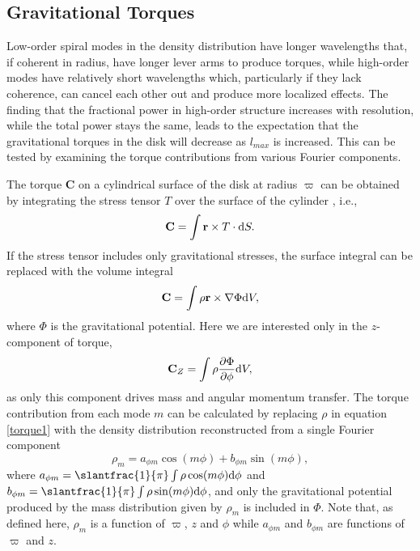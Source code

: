 \documentclass[manuscript]{aastex}
\begin{document}
\subsection{Gravitational Torques}

Low-order spiral modes in the density distribution have longer wavelengths that, if coherent in radius, have longer lever 
arms to produce torques, while high-order modes have relatively short wavelengths which, particularly if they 
lack coherence, can cancel each other out and produce more localized effects. 
The finding that the fractional power in high-order structure increases
with resolution, while the total power stays the same, leads to
 the expectation that the gravitational torques in the disk will decrease as $l_{max}$ is increased. This can be tested by examining the torque contributions from  various Fourier components.

The torque {\bf C} on a cylindrical surface of the disk at radius $\varpi$ can be obtained by integrating the stress tensor $T$ over the surface of the cylinder \citep{lyndenbell1972, boley2006}, i.e., 
\begin{equation}
{\rm {\bf C}} = \int {\bf r} \times T \cdot {\rm d}S.
\end{equation}
If the stress tensor includes only gravitational stresses, the surface integral can be replaced with the volume integral
\begin{equation}
{\rm \bf C} = \int \rho {\bf r} \times \nabla \Phi {\rm d}V,
\end{equation}
where $\Phi$ is the gravitational potential.  Here we are interested only in the $z$-component of torque,  
\begin{equation}
\label{torque1}
{\rm \bf C}_Z = \int \rho \frac{\partial\Phi} {\partial \phi} {\rm d}V,
\end{equation}
as only this component drives mass and angular momentum transfer. The torque contribution from each mode $m$ can be calculated by replacing $\rho$ in equation \eqref{torque1} with the density distribution reconstructed from a single Fourier component
\begin{equation}
\rho_m = a_{\phi m} \cos(m\phi) + b_{\phi m} \sin(m\phi),
\end{equation}
where $a_{\phi m} =\slantfrac{1}{\pi} \int \rho \cos(m\phi){\rm d}\phi$ and $b_{\phi m} =\slantfrac{1}{\pi} \int \rho \sin(m\phi){\rm d}\phi$, and only the gravitational potential produced by the mass distribution given by $\rho_m$ is included in $\Phi$.
Note that, as defined here, $\rho_m$ is a  function of $\varpi$, $z$ and $\phi$ while $a_{\phi m}$ and
$b_{\phi m}$ are functions of $\varpi$ and $z$.
\end{document}
